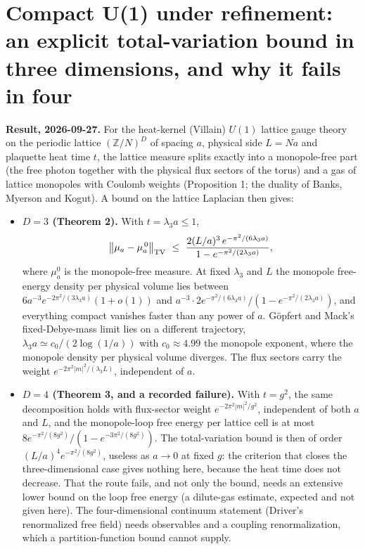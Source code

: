 \documentclass[11pt,a4paper]{article}
\newcommand{\tightlist}{\setlength{\itemsep}{0pt}\setlength{\parskip}{0pt}}
\begin{document}
\hypertarget{compact-u1-under-refinement-an-explicit-total-variation-bound-in-three-dimensions-and-why-it-fails-in-four}{%
\section{Compact U(1) under refinement: an explicit total-variation
bound in three dimensions, and why it fails in
four}\label{compact-u1-under-refinement-an-explicit-total-variation-bound-in-three-dimensions-and-why-it-fails-in-four}}

\textbf{Result, 2026-09-27.} For the heat-kernel (Villain) \(U(1)\)
lattice gauge theory on the periodic lattice \((\mathbb Z/N)^D\) of
spacing \(a\), physical side \(L=Na\) and plaquette heat time \(t\), the
lattice measure splits exactly into a monopole-free part (the free
photon together with the physical flux sectors of the torus) and a gas
of lattice monopoles with Coulomb weights (Proposition 1; the duality of
Banks, Myerson and Kogut). A bound on the lattice Laplacian then gives:

\begin{itemize}
\tightlist
\item
  \textbf{\(D=3\) (Theorem 2).} With \(t=\lambda_3a\le1\),
  \[\bigl\|\mu_{a}-\mu_{a}^{\,0}\bigr\|_{\rm TV}\ \le\
  \frac{2(L/a)^3\,e^{-\pi^2/(6\lambda_3a)}}{1-e^{-\pi^2/(2\lambda_3a)}},\]
  where \(\mu_a^0\) is the monopole-free measure. At fixed \(\lambda_3\)
  and \(L\) the monopole free-energy density per physical volume lies
  between \(6a^{-3}e^{-2\pi^2/(3\lambda_3a)}(1+o(1))\) and
  \(a^{-3}\cdot2e^{-\pi^2/(6\lambda_3a)}/(1-e^{-\pi^2/(2\lambda_3a)})\),
  and everything compact vanishes faster than any power of \(a\).
  Göpfert and Mack's fixed-Debye-mass limit lies on a different
  trajectory, \(\lambda_3a\simeq c_0/(2\log(1/a))\) with
  \(c_0\approx4.99\) the monopole exponent, where the monopole density
  per physical volume diverges. The flux sectors carry the weight
  \(e^{-2\pi^2|m|^2/(\lambda_3L)}\), independent of \(a\).
\item
  \textbf{\(D=4\) (Theorem 3, and a recorded failure).} With \(t=g^2\),
  the same decomposition holds with flux-sector weight
  \(e^{-2\pi^2|m|^2/g^2}\), independent of both \(a\) and \(L\), and the
  monopole-loop free energy per lattice cell is at most
  \(8e^{-\pi^2/(8g^2)}/(1-e^{-3\pi^2/(8g^2)})\). The total-variation
  bound is then of order \((L/a)^4e^{-\pi^2/(8g^2)}\), useless as
  \(a\to0\) at fixed \(g\): the criterion that closes the
  three-dimensional case gives nothing here, because the heat time does
  not decrease. That the route fails, and not only the bound, needs an
  extensive lower bound on the loop free energy (a dilute-gas estimate,
  expected and not given here). The four-dimensional continuum statement
  (Driver's renormalized free field) needs observables and a coupling
  renormalization, which a partition-function bound cannot supply.
\end{itemize}
\end{document}
